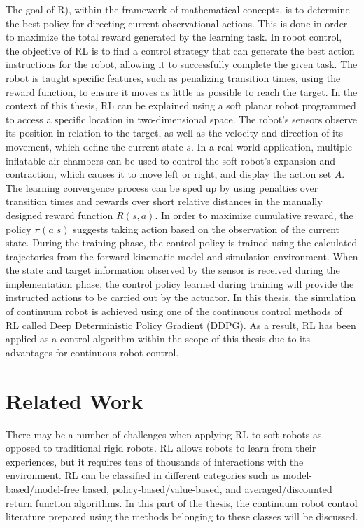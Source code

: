 \documentclass[12pt,twoside,a4]{mwbk}
\begin{document}
The goal of R), within the framework of mathematical concepts, is to determine the best policy for directing current observational actions. This is done in order to maximize the total reward generated by the learning task. In robot control, the objective of RL is to find a control strategy that can generate the best action instructions for the robot, allowing it to successfully complete the given task. The robot is taught specific features, such as penalizing transition times, using the reward function, to ensure it moves as little as possible to reach the target. In the context of this thesis, RL can be explained using a soft planar robot programmed to access a specific location in two-dimensional space. The robot's sensors observe its position in relation to the target, as well as the velocity and direction of its movement, which define the current state $s$. In a real world application, multiple inflatable air chambers can be used to control the soft robot's expansion and contraction, which causes it to move left or right, and display the action set $A$. The learning convergence process can be sped up by using penalties over transition times and rewards over short relative distances in the manually designed reward function $R(s, a)$. In order to maximize cumulative reward, the policy $\pi(a|s)$ suggests taking action based on the observation of the current state. During the training phase, the control policy is trained using the calculated trajectories from the forward kinematic model and simulation environment. When the state and target information observed by the sensor is received during the implementation phase, the control policy learned during training will provide the instructed actions to be carried out by the actuator. In this thesis, the simulation of continuum robot is achieved using one of the continuous control methods of RL called Deep Deterministic Policy Gradient (DDPG). As a result, RL has been applied as a control algorithm within the scope of this thesis due to its advantages for continuous robot control.

\section {Related Work}
There may be a number of challenges when applying RL to soft robots as opposed to traditional rigid robots. RL allows robots to learn from their experiences, but it requires tens of thousands of interactions with the environment. RL can be classified in different categories such as model-based/model-free based, policy-based/value-based, and averaged/discounted return function algorithms. In this part of the thesis, the continuum robot control literature prepared using the methods belonging to these classes will be discussed.
\end{document}
